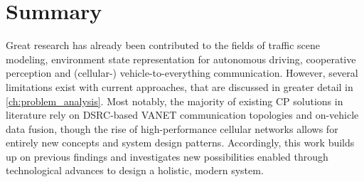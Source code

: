 \section{Summary}
\label{sec:related_work:summary}
Great research has already been contributed to the fields of traffic scene modeling, environment state representation for autonomous driving, cooperative perception and (cellular-) vehicle-to-everything communication. However, several limitations exist with current approaches, that are discussed in greater detail in \cref{ch:problem_analysis}. Most notably, the majority of existing CP solutions in literature rely on DSRC-based VANET communication topologies and on-vehicle data fusion, though the rise of high-performance cellular networks allows for entirely new concepts and system design patterns. Accordingly, this work builds up on previous findings and investigates new possibilities enabled through technological advances to design a holistic, modern system. 